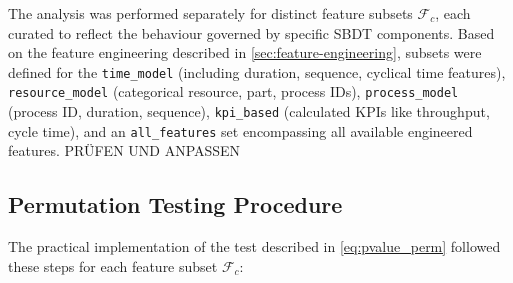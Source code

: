 The analysis was performed separately for distinct feature subsets $\mathcal{F}_c$, each curated to reflect the behaviour governed by specific SBDT components. Based on the feature engineering described in \autoref{sec:feature-engineering}, subsets were defined for the \texttt{time\_model} (including duration, sequence, cyclical time features), \texttt{resource\_model} (categorical resource, part, process IDs), \texttt{process\_model} (process ID, duration, sequence), \texttt{kpi\_based} (calculated KPIs like throughput, cycle time), and an \texttt{all\_features} set encompassing all available engineered features. PRÜFEN UND ANPASSEN

\subsection*{Permutation Testing Procedure}

The practical implementation of the test described in \autoref{eq:pvalue_perm} followed these steps for each feature subset $\mathcal{F}_c$:

